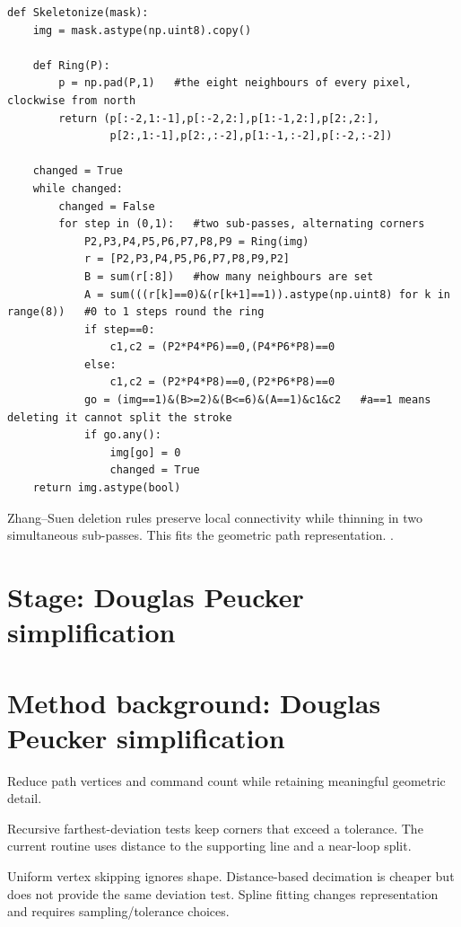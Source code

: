 \begin{lstlisting}[style=plain]
def Skeletonize(mask):
    img = mask.astype(np.uint8).copy()

    def Ring(P):
        p = np.pad(P,1)   #the eight neighbours of every pixel, clockwise from north
        return (p[:-2,1:-1],p[:-2,2:],p[1:-1,2:],p[2:,2:],
                p[2:,1:-1],p[2:,:-2],p[1:-1,:-2],p[:-2,:-2])

    changed = True
    while changed:
        changed = False
        for step in (0,1):   #two sub-passes, alternating corners
            P2,P3,P4,P5,P6,P7,P8,P9 = Ring(img)
            r = [P2,P3,P4,P5,P6,P7,P8,P9,P2]
            B = sum(r[:8])   #how many neighbours are set
            A = sum(((r[k]==0)&(r[k+1]==1)).astype(np.uint8) for k in range(8))   #0 to 1 steps round the ring
            if step==0:
                c1,c2 = (P2*P4*P6)==0,(P4*P6*P8)==0
            else:
                c1,c2 = (P2*P4*P8)==0,(P2*P6*P8)==0
            go = (img==1)&(B>=2)&(B<=6)&(A==1)&c1&c2   #a==1 means deleting it cannot split the stroke
            if go.any():
                img[go] = 0
                changed = True
    return img.astype(bool)
\end{lstlisting}
Zhang--Suen deletion rules preserve local connectivity while thinning in two simultaneous sub-passes. This fits the geometric path representation. \cite{zhangsuen1984,skmorph}.


\section*{Stage: Douglas Peucker simplification}
\section{Method background: Douglas Peucker simplification}\label{method:simplify}
Reduce path vertices and command count while retaining meaningful geometric detail.


Recursive farthest-deviation tests keep corners that exceed a tolerance. The current routine uses distance to the supporting line and a near-loop split.


Uniform vertex skipping ignores shape. Distance-based decimation is cheaper but does not provide the same deviation test. Spline fitting changes representation and requires sampling/tolerance choices.


